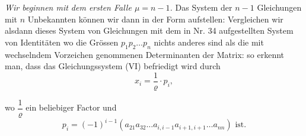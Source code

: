 \textit{Wir beginnen mit dem ersten Falle $\mu = n - 1$.} Das System der
$n - 1$ Gleichungen mit $n$ Unbekannten k\"onnen wir dann in der Form
aufstellen:
Vergleichen wir alsdann dieses System von Gleichungen mit dem in Nr. 34
aufgestellten System von Identit\"aten
wo die Gr\"ossen $p_1 p_2 \ldots p_n$ nichts anderes sind als die mit
wechselndem Vorzeichen genommenen Determinanten der Matrix:
so erkennt man, dass das Gleichungssystem (VI) befriedigt wird durch
\[
x_i = \frac{1}{\varrho} \cdot p_i,
\]


wo $\dfrac{1}{\varrho}$ ein beliebiger Factor und
\[ p_i = (-1)^{i-1}(a_{21}a_{32}\ldots a_{i,i-1}a_{i+1,i+1}\ldots a_{nn}) \text{ ist.} \]

